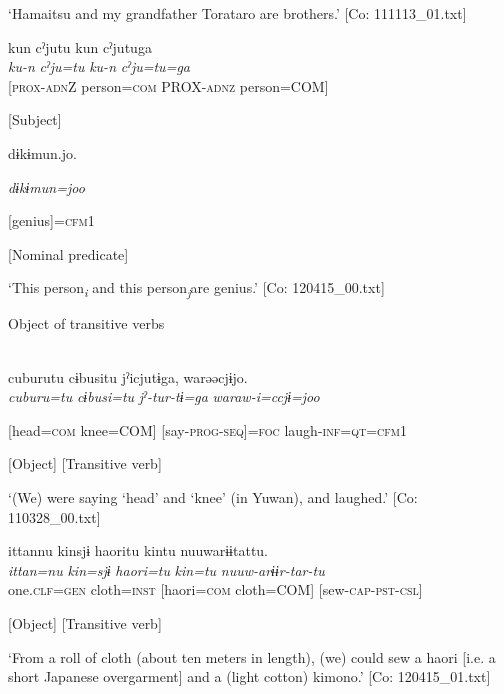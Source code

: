 \glt ‘Hamaitsu and my grandfather Torataro are brothers.’ [Co: 111113\_01.txt]
\z

 \ex {\TM}  kun  cˀjutu  kun  cˀjutuga\\
\gll \textit{ku-n}  \textit{cˀju=tu}  \textit{ku-n}  \textit{cˀju=tu=ga}\\

      [\textsc{prox}-\textsc{adn}Z  person=\textsc{com}  PROX-\textsc{adnz}  person=COM]

      [Subject]

      dɨkɨmun.jo.

      \textit{dɨkɨmun=joo}

      [genius]=\textsc{cfm}1

      [Nominal predicate]

\glt ‘This person\textit{\textsubscript{i}} and this person\textit{\textsubscript{j}}are genius.’ [Co: 120415\_00.txt]
\z

  Object of transitive verbs

 \ex{}\\
{\TM}
\gll  cuburutu  cɨbusitu  jˀicjutɨga,  warəəcjɨjo.\\

      \textit{cuburu=tu}  \textit{cɨbusi=tu}  \textit{jˀ-tur-tɨ=ga}  \textit{waraw-i=ccjɨ=joo}

      [head=\textsc{com}  knee=COM]  [say-\textsc{prog}-\textsc{seq}]=\textsc{foc}  laugh-\textsc{inf}=\textsc{qt}=\textsc{cfm}1

      [Object]  [Transitive verb]  

\glt ‘(We) were saying ‘head’ and ‘knee’ (in Yuwan), and laughed.’ [Co: 110328\_00.txt]
\z

 \ex {\TM}  ittannu  kinsjɨ  {\textbar}haori{\textbar}tu  kintu  nuuwarɨɨtattu.\\
\gll \textit{ittan=nu}  \textit{kin=sjɨ}  \textit{haori=tu}  \textit{kin=tu}  \textit{nuuw-arɨɨr-tar-tu}\\

      one.\textsc{clf}=\textsc{gen}  cloth=\textsc{inst}  [haori=\textsc{com}  cloth=COM]  [sew-\textsc{cap}-\textsc{pst}-\textsc{csl}]

          [Object]  [Transitive verb]

\glt ‘From a roll of cloth (about ten meters in length), (we) could sew a haori [i.e. a short Japanese overgarment] and a (light cotton) kimono.’ [Co: 120415\_01.txt]
\z

